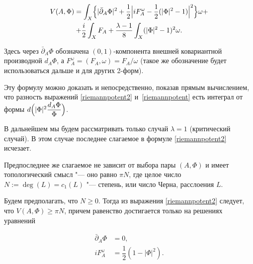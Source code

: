 
\begin{multline}

\label{riemannpotent2}

V(A,\Phi)=\int _{X}\Bigl\{|\bar\partial_A\Phi|^2+ \dfrac12

\Bigl|iF_A^\omega-\dfrac12(|\Phi|^2-1)\Bigr|^2\Bigr\}\omega+ \\

+ \dfrac i 2\int _X F_A+ \dfrac{\lambda-1}{8}\int _X(|\Phi|^2-1)^2\omega.

\end{multline}

Здесь через $\bar\partial_A\Phi$ обозначена $(0, 1)$-компонента внешней ковариантной производной $d_A\Phi$, а $F_A^\omega=(F_A,\omega)={F_A}/{\omega}$ (такое же обозначение будет использоваться дальше и для других 2-форм). 

Эту формулу можно доказать и непосредственно, показав прямым вычислением, что разность выражений \eqref{riemannpotent2} и~\eqref{riemannpotent} есть интеграл от формы $d\Bigl(|\Phi|^2\dfrac{d_A\Phi}{\Phi}\Bigr)$.



В дальнейшем мы будем рассматривать только случай $\lambda=1$ (критический случай). В этом случае последнее слагаемое в формуле \eqref{riemannpotent2} исчезает.

Предпоследнее же слагаемое не зависит от выбора пары $(A,\Phi)$ и имеет топологический смысл "--- оно равно $\pi N$, где целое число $N:=\deg(L)=c_1(L)$ "---  степень, или число Черна, расслоения $L$. 



Будем предполагать, что $N\geqslant0$. Тогда из выражения \eqref{riemannpotent2} следует, что $V(A,\Phi)\geqslant \pi N$, причем равенство достигается только на решениях уравнений

\begin{equation}

\label{riemannvortexeq}

\begin{aligned}

\bar\partial_A\Phi&=0,\\

iF_A^\omega&=\dfrac12(1-|\Phi|^2).

\end{aligned}

\end{equation}



